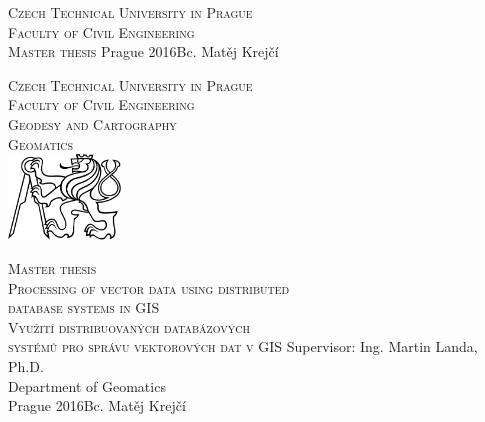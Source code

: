 \begin{center}
\newcommand{\napisCVUT}{Czech Technical University in Prague}
\newcommand{\napisFS}{Faculty of Civil Engineering}
\newcommand{\napisProgram}{Geodesy and Cartography}
\newcommand{\napisObor}{Geomatics}
\newcommand{\napisKatedra}{Department of Geomatics}
\newcommand{\napisVedouci}{Ing. Martin Landa, Ph.D.}
\newcommand{\napisAutor}{Bc. Matěj Krejčí}
\newcommand{\napisDatum}{Prague 2016}
\newcommand{\napisNazevI}{Processing of vector data using distributed}
\newcommand{\napisNazevII}{database systems in GIS}
\newcommand{\napisNazevAjI}{Využití distribuovaných databázových}
\newcommand{\napisNazevAjII}{ systémů pro správu vektorových dat v GIS}
\newcommand{\napisBakalarka}{Master thesis}
\newcommand{\napisPraha}{Prague 2016}
%
\newcommand{\velka}[1]{\textsc{#1}}
%
% 
\newif\ifpatitul
\patitultrue

\ifpatitul
{\Large\velka{\napisCVUT}}\\
\velka{\Large\napisFS}\\
\vfill
{\LARGE\velka{\napisBakalarka}}
\vfill
{\large\napisPraha\hfill\napisAutor}
\newpage
\fi%


{\Large\velka{\napisCVUT}}\\
{\Large\velka{\napisFS}}\\
{\Large\velka{\napisProgram}}\\
{\Large\velka{\napisObor}}\\
\vfill
\includegraphics[width=3cm]{logo_cvut_cb} %
\vfill

{\Large\velka{\napisBakalarka}}\\
{\Large\velka{\napisNazevI\\
\napisNazevII}}\\
{\large\velka{\napisNazevAjI\\
\napisNazevAjII}}
\vfill
{\large%
Supervisor: \napisVedouci\\
\napisKatedra\\
\bigskip
\napisDatum\hfill\napisAutor}
\end{center}
